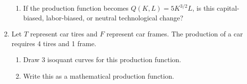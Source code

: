 \documentclass[11pt]{article}
\begin{document}
\begin{enumerate}
\begin{enumerate}
    \item If the production function becomes $Q(K,L) = 5K^{3/2}L$, is this capital-biased, labor-biased, or neutral technological change?
  \end{enumerate}

  \item Let $T$ represent car tires and $F$ represent car frames. The production of a car requires 4 tires and 1 frame. 
  \begin{enumerate}
    \item Draw 3 isoquant curves for this production function.
    
    \item Write this as a mathematical production function.
  \end{enumerate}
\end{enumerate}
\end{document}
